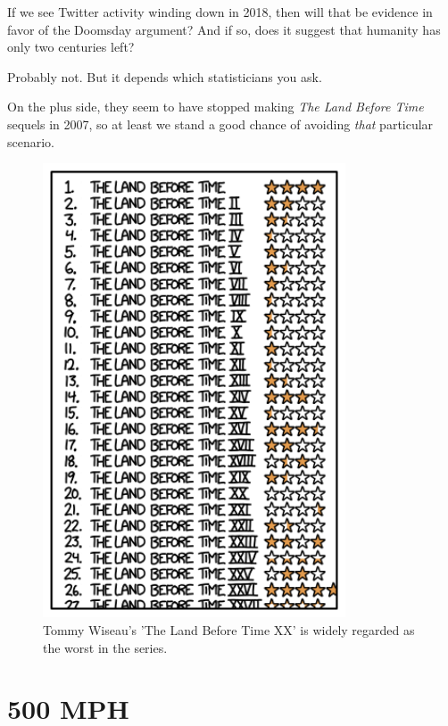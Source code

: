 {{If we see Twitter activity winding down in 2018, then will that be evidence in favor of the Doomsday argument? And if so, does it suggest that humanity has only two centuries left?}

{Probably not. But it depends which statisticians you ask.}

{On the plus side, they seem to have stopped making \emph{The Land Before Time} sequels in 2007, so at least we stand a good chance of avoiding \emph{that} particular scenario.}

\begin{figure}[!htbp]
\centering
\includegraphics[scale=0.5, max width=0.8\textwidth]{imgs/a/65/timeline_lbt.png}
\caption{Tommy Wiseau's 'The Land Before Time XX' is widely regarded as the worst in the series.}
\end{figure}

{
\chapter{500 MPH}
}

}
